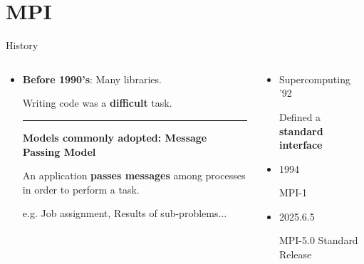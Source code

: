 \section{MPI}

\begin{frame}{History}
    \begin{columns}
    
        \begin{column}{0.55\textwidth}

    \begin{itemize}
        \item \textbf{Before 1990's}: Many libraries. 

        Writing code was a \alert{\textbf{difficult}} task.

        \vspace{0.2cm}
        \hrule{}
        \vspace{0.2cm}
        {\textbf{Models commonly adopted: Message Passing Model}}
        
        An application \alert{\textbf{passes messages}} among processes in order to perform a task.

        e.g. Job assignment, Results of sub-problems...
        
    \end{itemize}
    \end{column}

        \begin{column}{0.45\textwidth}
            \begin{itemize}
                \item Supercomputing '92

                Defined a \alert{\textbf{standard interface}}

                \item 1994

                MPI-1

                \item 2025.6.5
            
                MPI-5.0 Standard Release
            \end{itemize}
        \end{column}
    \end{columns}

\end{frame}

